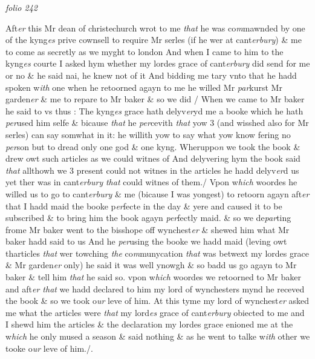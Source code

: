 \documentclass[12pt, a4paper]{book}
\begin{document}
\dotfill
					

\textit{folio 242}


Aft\textit{er} this Mr dean of christechurch wrot to me \textit{that }he was co\textit{m}mawnded by one of the kyng\textit{es} prive cownsell to require Mr serles (if he wer at cant\textit{erbury}) \& me to come as secretly as we myght to london And  when I came to him to the kyng\textit{es} courte I asked hym whether my  lordes grace of cant\textit{erbury} did send for me or no \& he said nai, he knew  not of it And biddi\textit{n}g me tary vnto that he hadd spoken w\textit{ith} one when he retoorned agayn to me he willed Mr \textit{par}kurst Mr garden\textit{er} \& me  to repare to Mr baker \& so we did / When we came to Mr baker he said to vs thus : The kyng\textit{es} grace hath delyv\textit{er}yd me a booke which he hath \textit{per}used him selfe \& bicause \textit{that} he \textit{per}cevith \textit{that} yow 3 (and  wisshed also for Mr serles) can say somwhat in it: he willith yow 
			to say what yow know fering no\textit{ per}son but to dread only one god \& one kyng. Wheruppo\textit{n} we took the book \& drew owt such articles as we could witnes of And delyveri\textit{n}g hym the book said \textit{that} allthowh we 3 present could not witnes in the articles he hadd delyv\textit{er}d us yet ther was in cant\textit{erbury}
               \textit{that} could witnes of them./ Vpon w\textit{hich} woordes he willed us to go to cant\textit{erbury} \& me (bicause I was yongest) to retoorn agayn aft\textit{er} that I hadd maid the booke p\textit{er}fecte in the day \& yere and  caused it to be subscribed \& to bring him the book agayn \textit{per}fectly maid. \& so we de\textit{par}ting frome Mr baker went to the bisshope off wynchest\textit{er} \& shewed him what Mr baker hadd said to us And he \textit{per}using the booke we hadd maid (leving owt tharticles \textit{that} wer towching  \textit{the }co\textit{m}munycation \textit{that} was betwext my lordes grace \& Mr garden\textit{er} only) he said it was well ynowgh \& so badd us go agayn to Mr baker \& tell him \textit{that}
               \textit{} he said so. vpon w\textit{hich} woordes we retoorned to Mr baker and aft\textit{er that} we hadd declared to him my lord of wynchesters mynd he receved the book \& so we took o\textit{ur} leve of him.   At this tyme my lord of wynchest\textit{er} asked me what the articles were \textit{that} my lord\textit{es} grace of cant\textit{erbury} obiected to me and I shewd him the articles \& the declaration my lordes grace enioned me at the w\textit{hich} he only  mused a season \& said nothing \& as he went to talke w\textit{ith} other we tooke o\textit{ur} leve of him./.
\end{document}
